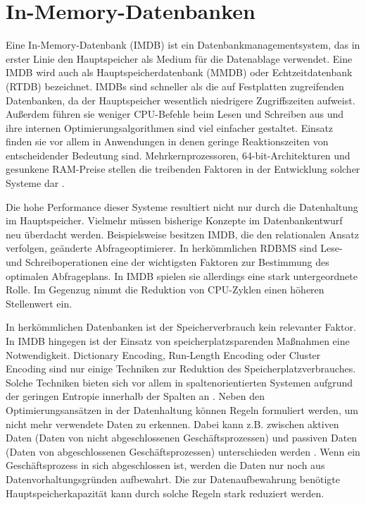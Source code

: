 \section{In-Memory-Datenbanken}
\label{ch:grundlagen:sec:InMemoryDatenbanken}

Eine In-Memory-Datenbank (IMDB) ist ein Datenbankmanagementsystem, das in erster Linie den Hauptspeicher als Medium für die Datenablage verwendet. Eine IMDB wird auch als Hauptspeicherdatenbank  (MMDB) oder Echtzeitdatenbank (RTDB) bezeichnet. IMDBs sind schneller als die auf Festplatten zugreifenden Datenbanken, da der Hauptspeicher wesentlich niedrigere Zugriffszeiten aufweist. Außerdem führen sie weniger CPU-Befehle beim Lesen und Schreiben aus und ihre internen Optimierungsalgorithmen sind viel einfacher gestaltet. Einsatz finden sie vor allem in Anwendungen in denen geringe Reaktionszeiten von entscheidender Bedeutung sind. Mehrkernprozessoren, 64-bit-Architekturen und gesunkene RAM-Preise stellen die treibenden Faktoren in der Entwicklung solcher Systeme dar \cite{SWB-381840476}.

Die hohe Performance dieser Systeme resultiert nicht nur durch die Datenhaltung im Hauptspeicher. Vielmehr müssen bisherige Konzepte im Datenbankentwurf neu überdacht werden. Beispielsweise besitzen IMDB, die den relationalen Ansatz verfolgen, geänderte Abfrageoptimierer. In herkömmlichen RDBMS sind Lese- und Schreiboperationen eine der wichtigsten Faktoren zur Bestimmung des optimalen Abfrageplans. In IMDB spielen sie allerdings eine stark untergeordnete Rolle. Im Gegenzug nimmt die Reduktion von CPU-Zyklen einen höheren Stellenwert ein.

In herkömmlichen Datenbanken ist der Speicherverbrauch kein relevanter Faktor. In IMDB hingegen ist der Einsatz von speicherplatzsparenden Maßnahmen eine Notwendigkeit. Dictionary Encoding, Run-Length Encoding oder Cluster Encoding sind nur einige Techniken zur Reduktion des Speicherplatzverbrauches. Solche Techniken bieten sich vor allem in spaltenorientierten Systemen aufgrund der geringen Entropie innerhalb der Spalten an \cite{Abadi:2006:ICE:1142473.1142548}. Neben den Optimierungsansätzen in der Datenhaltung können Regeln formuliert werden, um nicht mehr verwendete Daten zu erkennen. Dabei kann z.B. zwischen aktiven Daten (Daten von nicht abgeschlossenen Geschäftsprozessen) und passiven Daten (Daten von abgeschlossenen Geschäftsprozessen) unterschieden werden \cite{10.1109/ICDE.2013.6544811}. Wenn ein Geschäftsprozess in sich abgeschlossen ist, werden die Daten nur noch aus Datenvorhaltungsgründen aufbewahrt. Die zur Datenaufbewahrung benötigte Hauptspeicherkapazität kann durch solche Regeln stark reduziert werden.

